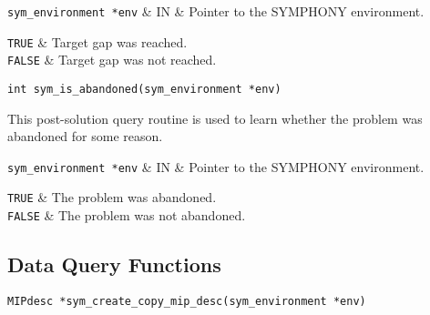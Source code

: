 \args

{\tt sym\_environment *env} & IN & Pointer to the SYMPHONY environment.
\et

\returns

{\tt TRUE} & Target gap was reached. \\
{\tt FALSE} & Target gap was not reached.\\
\et

\ed
\vspace{1ex}


\begin{verbatim}
int sym_is_abandoned(sym_environment *env)
\end{verbatim}

\bd
\describe

This post-solution query routine is used to learn whether the problem 
was abandoned for some reason.

\args

{\tt sym\_environment *env} & IN & Pointer to the SYMPHONY environment.
\et

\returns

{\tt TRUE} & The problem was abandoned. \\
{\tt FALSE} & The problem was not abandoned.\\
\et
\ed
\vspace{1ex}

\ed

\newpage

\subsection{Data Query Functions}

\bd


\begin{verbatim}
MIPdesc *sym_create_copy_mip_desc(sym_environment *env)
\end{verbatim}

\bd
\describe

